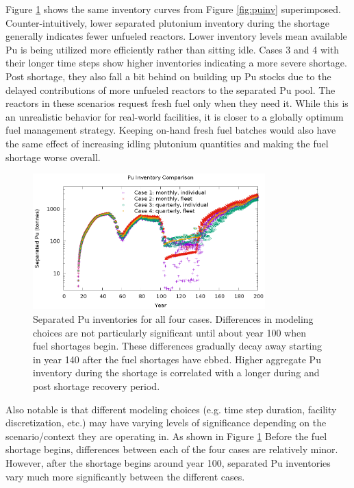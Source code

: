 \documentclass{style}
\begin{document}
Figure \ref{fig:puinv-compare} shows the same inventory curves from Figure
\ref{fig:puinv} superimposed. Counter-intuitively, lower separated plutonium
inventory during the shortage generally indicates fewer unfueled reactors.
Lower inventory levels mean available Pu is being utilized more efficiently
rather than sitting idle.  Cases 3 and 4 with their longer time steps show
higher inventories indicating a more severe shortage.  Post shortage, they
also fall a bit behind on building up Pu stocks due to the delayed
contributions of more unfueled reactors to the separated Pu pool.  The
reactors in these scenarios request fresh fuel only when they need it. While
this is an unrealistic behavior for real-world facilities, it is closer to a
globally optimum fuel management strategy.  Keeping on-hand fresh fuel batches
would also have the same effect of increasing idling plutonium quantities and
making the fuel shortage worse overall.

\begin{figure}[!h]
    \centering
    \includegraphics[width=0.8\textwidth]{exp2/puinv-compare.eps}
    \caption{
        Separated Pu inventories for all four cases.  Differences in modeling
        choices are not particularly significant until about year 100 when
        fuel shortages begin.  These differences gradually decay away starting
        in year 140 after the fuel shortages have ebbed.  Higher aggregate Pu
        inventory  during the shortage is correlated with a longer during and
        post shortage recovery period.
    }
    \label{fig:puinv-compare}
\end{figure}

Also notable is that different modeling choices (e.g. time step duration,
facility discretization, etc.) may have varying levels of significance
depending on the scenario/context they are operating in.  As shown in Figure
\ref{fig:puinv-compare} Before the fuel shortage begins, differences between
each of the four cases are relatively minor.  However, after the shortage
begins around year 100, separated Pu inventories vary much more significantly
between the different cases.
\end{document}
